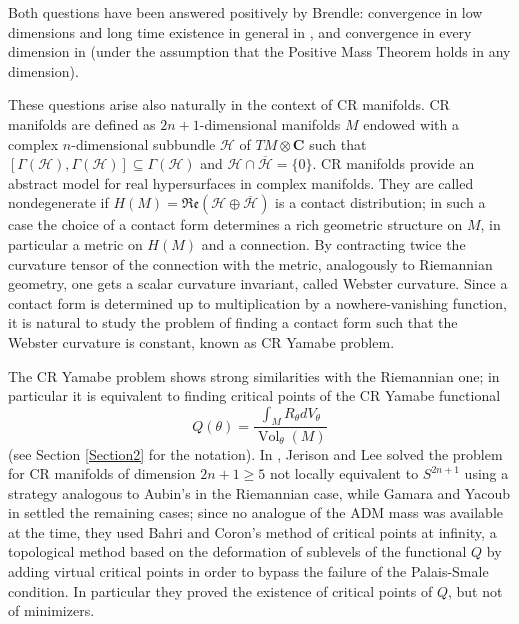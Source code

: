 \documentclass[a4paper,12pt]{amsart}
\newcommand{\C}{\mathbf{C}}
\newcommand{\ci}[1]{\mathscr{#1}}%
\newcommand{\rosso}[1]{{\color{red}#1}}
\newcommand{\g}[1]{\mathfrak{#1}}
\DeclareMathOperator{\Vol}{Vol}
\begin{document}
Both questions have been answered positively by Brendle: convergence in low dimensions and long time existence in general in \cite{B-LowDim}, and convergence in every dimension in \cite{B-Convergence} (under the assumption that the Positive Mass Theorem holds in any dimension). %

\vspace{5mm}

These questions arise also naturally in the context of CR manifolds.
CR manifolds are defined as $2n+1$-dimensional manifolds $M$ endowed with a complex $n$-dimensional subbundle $\ci{H}$ of $TM\otimes\C$ such that $[\Gamma(\ci{H}),\Gamma(\ci{H})]\subseteq\Gamma(\ci{H})$ and $\ci{H}\cap\overline{\ci{H}}=\{0\}$. CR manifolds provide an abstract model for real hypersurfaces in complex manifolds.
They are called nondegenerate if $H(M)=\g{Re}(\ci{H}\oplus\overline{\ci{H}})$ is a contact distribution; in such a case the choice of a contact form determines a rich geometric structure on $M$,
in particular a metric on $H(M)$ and a connection. By contracting twice the curvature tensor of the connection with the metric, analogously to Riemannian geometry, one gets a scalar curvature invariant, called Webster curvature.
Since a contact form is determined up to multiplication by a nowhere-vanishing function, it is natural to study the problem of finding a contact form such that the Webster curvature is constant, known as CR Yamabe problem.

The CR Yamabe problem shows strong similarities with the Riemannian one; in particular it is equivalent to finding critical points of the CR Yamabe functional
$$Q(\theta)=\frac{\int_MR_{\theta}dV_{\theta}}{\Vol_{\theta}(M)}$$
(see Section \ref{Section2} for the notation).
In  \cite{JL}, Jerison and Lee solved the problem for CR manifolds of dimension $2n+1\ge 5$ not locally equivalent to $S^{2n+1}$ using a strategy analogous to Aubin’s in the Riemannian case, while Gamara and Yacoub in \cite{G,GY} settled the remaining cases; since no analogue of the ADM mass was available at the time, they used Bahri and Coron's method of critical points at infinity, a topological method based on the deformation of sublevels of the functional $Q$ by adding virtual critical points in order to bypass the failure of the Palais-Smale condition. In particular they proved the existence of critical points of $Q$, but not of minimizers.
\end{document}
